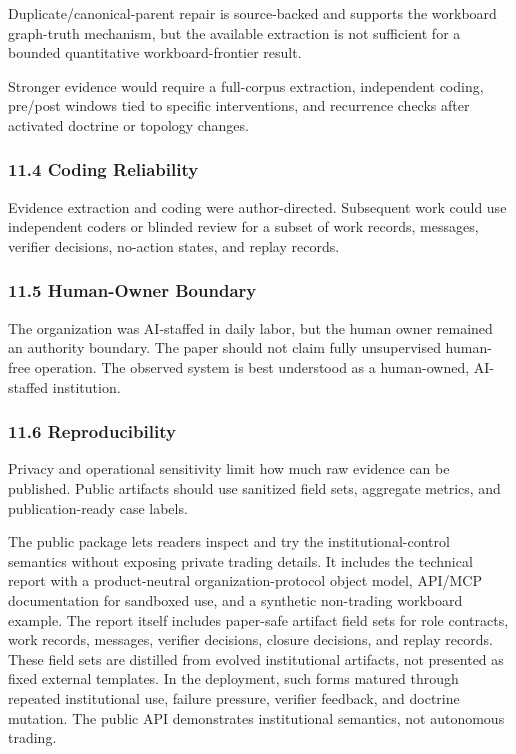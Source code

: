 \documentclass[
]{article}
\begin{document}
Duplicate/canonical-parent repair is source-backed and supports the workboard graph-truth mechanism, but the available extraction is not sufficient for a bounded quantitative workboard-frontier result.

Stronger evidence would require a full-corpus extraction, independent coding, pre/post windows tied to specific interventions, and recurrence checks after activated doctrine or topology changes.

\subsubsection{11.4 Coding Reliability}\label{coding-reliability}

Evidence extraction and coding were author-directed. Subsequent work could use independent coders or blinded review for a subset of work records, messages, verifier decisions, no-action states, and replay records.

\subsubsection{11.5 Human-Owner Boundary}\label{human-owner-boundary}

The organization was AI-staffed in daily labor, but the human owner remained an authority boundary. The paper should not claim fully unsupervised human-free operation. The observed system is best understood as a human-owned, AI-staffed institution.

\subsubsection{11.6 Reproducibility}\label{reproducibility}

Privacy and operational sensitivity limit how much raw evidence can be published. Public artifacts should use sanitized field sets, aggregate metrics, and publication-ready case labels.

The public package lets readers inspect and try the institutional-control semantics without exposing private trading details. It includes the technical report with a product-neutral organization-protocol object model, API/MCP documentation for sandboxed use, and a synthetic non-trading workboard example. The report itself includes paper-safe artifact field sets for role contracts, work records, messages, verifier decisions, closure decisions, and replay records. These field sets are distilled from evolved institutional artifacts, not presented as fixed external templates. In the deployment, such forms matured through repeated institutional use, failure pressure, verifier feedback, and doctrine mutation. The public API demonstrates institutional semantics, not autonomous trading.
\end{document}
